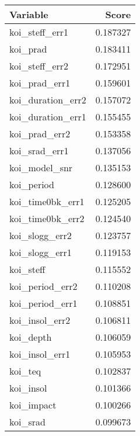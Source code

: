 \begin{tabular}{lr}
\toprule
          Variable &     Score \\
\midrule
    koi\_steff\_err1 &  0.187327 \\
          koi\_prad &  0.183411 \\
    koi\_steff\_err2 &  0.172951 \\
     koi\_prad\_err1 &  0.159601 \\
 koi\_duration\_err2 &  0.157072 \\
 koi\_duration\_err1 &  0.155455 \\
     koi\_prad\_err2 &  0.153358 \\
     koi\_srad\_err1 &  0.137056 \\
     koi\_model\_snr &  0.135153 \\
        koi\_period &  0.128600 \\
  koi\_time0bk\_err1 &  0.125205 \\
  koi\_time0bk\_err2 &  0.124540 \\
    koi\_slogg\_err2 &  0.123757 \\
    koi\_slogg\_err1 &  0.119153 \\
         koi\_steff &  0.115552 \\
   koi\_period\_err2 &  0.110208 \\
   koi\_period\_err1 &  0.108851 \\
    koi\_insol\_err2 &  0.106811 \\
         koi\_depth &  0.106059 \\
    koi\_insol\_err1 &  0.105953 \\
           koi\_teq &  0.102837 \\
         koi\_insol &  0.101366 \\
        koi\_impact &  0.100266 \\
          koi\_srad &  0.099673 \\
\bottomrule
\end{tabular}
